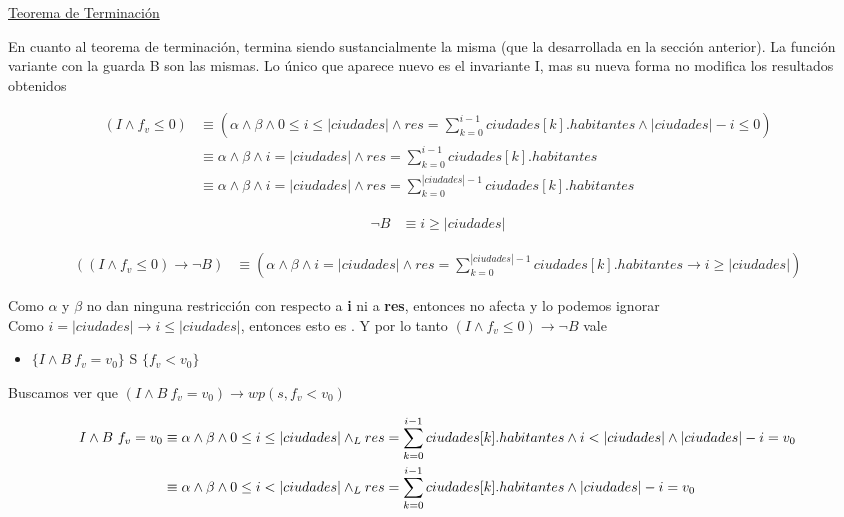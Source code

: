 \documentclass[10pt,a4paper]{article}
\begin{document}
\begin {enumerate}
    \underline{Teorema de Terminación}
    
    En cuanto al teorema de terminación, termina siendo sustancialmente la misma (que la desarrollada en la sección anterior). La función 
    variante con la guarda B son las mismas. Lo único que aparece nuevo es el invariante I, mas su nueva forma no modifica los resultados obtenidos

    \begin{align*}
        (I \land f_{v} \leq 0) &\equiv (\alpha \land \beta \land 0 \leq i \leq |ciudades| \land res = \sum\limits_{k=0}^{i -1}{ciudades[k].habitantes} \land |ciudades| - i \leq 0) \\
        &\equiv \alpha \land \beta \land i = |ciudades| \land res = \sum\limits_{k=0}^{i -1}{ciudades[k].habitantes} \\
        &\equiv \alpha \land \beta \land i = |ciudades| \land res = \sum\limits_{k=0}^{|ciudades| -1}{ciudades[k].habitantes}
    \end{align*}


    \begin{align*}
        \neg B &\equiv i \geq |ciudades|
    \end{align*}


    \begin{align*}
        ((I \land f_{v} \leq 0) \to \neg B) &\equiv (\alpha \land \beta \land i = |ciudades| \land res = \sum\limits_{k=0}^{|ciudades| -1}{ciudades[k].habitantes} \to i \geq |ciudades|)
    \end{align*}

    Como $\alpha$ y $\beta$ no dan ninguna restricción con respecto a \textbf{i} ni a \textbf{res}, entonces no afecta y lo podemos ignorar \\
    Como $i = |ciudades| \to i \leq |ciudades|$, entonces esto es \True . Y por lo tanto $(I \land f_{v} \leq 0) \to \neg B $ vale

    \begin{itemize}
        \item 
            $\{ I \land B \ f_{v} = v_{0}  \}$ S $\{f_{v} < v_{0}\}$
    \end{itemize}
    
    Buscamos ver que  $(I \land B \ f_{v} = v_{0}) \to wp(s, f_{v} < v_{0}) $
    
    \begin{align*}
        I \land B \ f_{v} = v_{0} &\equiv \alpha \land \beta \land 0 \leq i \leq |ciudades| \land _L res = \sum\limits_{k=0}^{i - 1}{ciudades[k].habitantes} \land i < |ciudades| \land |ciudades| - i = v_{0} \\
            &\equiv \alpha \land \beta \land 0 \leq i < |ciudades| \land _L res = \sum\limits_{k=0}^{i - 1}{ciudades[k].habitantes} \land |ciudades| - i = v_{0}
    \end{align*}


\end{enumerate}
\end{document}
